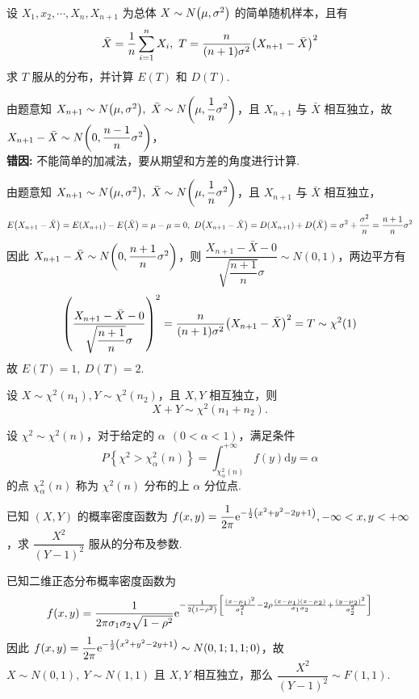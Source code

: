 \begin{example}
    设 $X_1,x_2,\cdots,X_n,X_{n+1}$ 为总体 $X\sim N\qty(\mu,\sigma^2)$ 的简单随机样本，且有 $$\bar{X}=\dfrac{1}{n}\displaystyle\sum_{i=1}^{n}X_i,~T=\dfrac{n}{(n+1)\sigma^2}\qty(X_{n+1}-\bar{X})^2$$
    求 $T$ 服从的分布，并计算 $E(T)$ 和 $D(T)$.
\end{example}
\begin{errorSolution}
    由题意知 $X_{n+1}\sim N\qty(\mu,\sigma^2),~\bar{X}\sim N\qty(\mu,\dfrac{1}{n}\sigma^2)$，且 $X_{n+1}$ 与 $\bar{X}$ 相互独立，故 $X_{n+1}-\bar{X}\sim N\qty(0,\dfrac{n-1}{n}\sigma^2)$，\\
    \textbf{错因: }不能简单的加减法，要从期望和方差的角度进行计算.\\
\end{errorSolution}
\begin{solution}
    由题意知 $X_{n+1}\sim N\qty(\mu,\sigma^2),~\bar{X}\sim N\qty(\mu,\dfrac{1}{n}\sigma^2)$，且 $X_{n+1}$ 与 $\bar{X}$ 相互独立，
    $$E\qty(X_{n+1}-\bar{X})=E(X_{n+1})-E\qty(\bar{X})=\mu-\mu=0,~D\qty(X_{n+1}-\bar{X})=D(X_{n+1})+D\qty(\bar{X})=\sigma^2+\dfrac{\sigma^2}{n}=\dfrac{n+1}{n}\sigma^2$$
    因此 $X_{n+1}-\bar{X}\sim N\qty(0,\dfrac{n+1}{n}\sigma^2)$，则 $\dfrac{X_{n+1}-\bar{X}-0}{\sqrt{\dfrac{n+1}{n}}\sigma}\sim N(0,1)$，两边平方有
    $$\qty(\dfrac{X_{n+1}-\bar{X}-0}{\sqrt{\dfrac{n+1}{n}}\sigma})^2=\dfrac{n}{(n+1)\sigma^2}\qty(X_{n+1}-\bar{X})^2=T\sim\chi^2(1)$$
    故 $E(T)=1,~D(T)=2.$
\end{solution}

\begin{theorem}[分布的可加性]
    设 $ X \sim \chi^{2}\left(n_{1}\right), Y \sim \chi^{2}\left(n_{2}\right) $，且 $ X, Y $ 相互独立，则
    $$X+Y \sim \chi^{2}\left(n_{1}+n_{2}\right) .$$
\end{theorem}

\begin{theorem}
    设 $ \chi^{2} \sim \chi^{2}(n) $，对于给定的 $ \alpha~~(0<\alpha<1) $，满足条件
    $$P\left\{\chi^{2}>\chi_{\alpha}^{2}(n)\right\}=\int_{\chi_{\alpha}^{2}(n)}^{+\infty} f(y) \mathrm{d} y=\alpha$$
    的点 $ \chi_{\alpha}^{2}(n) $ 称为 $ \chi^{2}(n) $ 分布的上 $ \alpha $ 分位点.
\end{theorem}

\begin{example}
    已知 $(X,Y)$ 的概率密度函数为 $\displaystyle f(x,y)=\dfrac{1}{2\pi}\mathrm{e}^{-\frac{1}{2}\qty(x^2+y^2-2y+1)},-\infty<x,y<+\infty$，求 $\dfrac{X^2}{(Y-1)^2}$ 服从的分布及参数.
\end{example}
\begin{solution}
    已知二维正态分布概率密度函数为 $$f(x,y)=\dfrac{1}{2\pi\sigma_1\sigma_2\sqrt{1-\rho^2}}\mathrm{e}^{-\frac{1}{2\qty(1-\rho^2)}\qty[\frac{(x-\mu_1)^2}{\sigma_1^2}-2\rho\frac{(x-\mu_1)(x-\mu_2)}{\sigma_1\sigma_2}+\frac{(y-\mu_2)^2}{\sigma_2^2}]}$$
    因此 $f(x,y)=\dfrac{1}{2\pi}\mathrm{e}^{-\frac{1}{2}\qty(x^2+y^2-2y+1)}\sim N(0,1;1,1;0)$，故 $X\sim N(0,1),~Y\sim N(1,1)$ 且 $X,Y$ 相互独立，那么 $\dfrac{X^2}{(Y-1)^2}\sim F(1,1).$
\end{solution}

